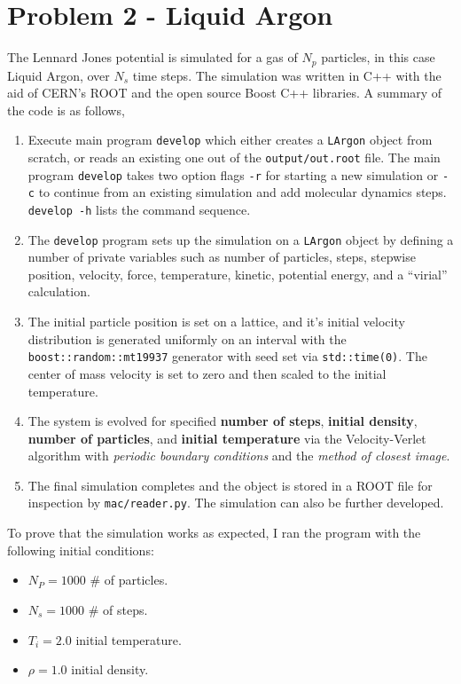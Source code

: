 \documentclass[singlepage,notitlepage,nofootinbib,11pt]{revtex4-1}
\begin{document}
\section{Problem 2 - Liquid Argon}
The Lennard Jones potential is simulated for a gas of $N_p$ particles, in this case Liquid Argon, over $N_s$ time steps. The simulation was written in C++ with the aid of CERN's ROOT and the open source Boost C++ libraries. A summary of the code is as follows,
\begin{enumerate}
\item Execute main program \verb|develop| which either creates a \verb|LArgon| object from scratch, or reads an existing one out of the \verb|output/out.root| file. The main program \verb|develop| takes two option flags \verb|-r| for starting a new simulation or \verb|-c| to continue from an existing simulation and add molecular dynamics steps. \verb|develop -h| lists the command sequence.
\item The \verb|develop| program sets up the simulation on a \verb|LArgon| object by defining a number of private variables such as number of particles, steps, stepwise position, velocity, force, temperature, kinetic, potential energy, and a ``virial'' calculation.
\item The initial particle position is set on a lattice, and it's initial velocity distribution is generated uniformly on an interval with the \verb|boost::random::mt19937| generator with seed set via \verb|std::time(0)|. The center of mass velocity is set to zero and then scaled to the initial temperature.
\item The system is evolved for specified {\bf number of steps}, {\bf initial density}, {\bf number of particles}, and {\bf initial temperature} via the Velocity-Verlet algorithm with {\it periodic boundary conditions} and the {\it method of closest image}.
\item The final simulation completes and the object is stored in a ROOT file for inspection by \verb|mac/reader.py|. The simulation can also be further developed.
\end{enumerate}
To prove that the simulation works as expected, I ran the program with the following initial conditions:
\begin{itemize}
\item $N_P = 1000$ \# of particles. 
\item $N_s = 1000$ \# of steps.
\item $T_i = 2.0$ initial temperature.
\item $\rho = 1.0$ initial density.
\end{itemize}
\end{document}
